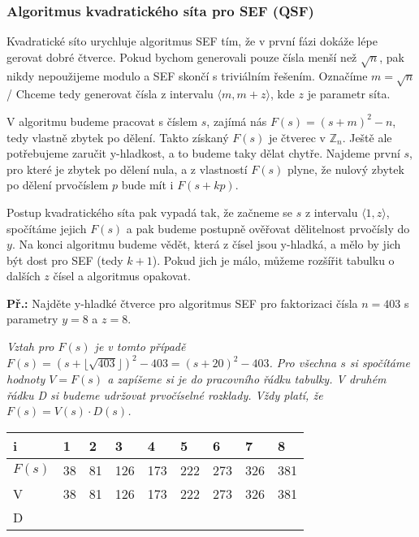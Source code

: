 \documentclass[10pt,a4paper]{article}
\begin{document}
\subsubsection{Algoritmus kvadratického síta pro SEF (QSF)}
Kvadratické síto urychluje algoritmus SEF tím, že v první fázi dokáže lépe gerovat dobré čtverce. Pokud bychom generovali pouze čísla menší než $\sqrt{n}$, pak nikdy nepoužijeme modulo a SEF skončí s triviálním řešením. Označíme $m = \sqrt{n}$/ Chceme tedy generovat čísla z intervalu $\langle m, m + z \rangle$, kde $z$ je parametr síta. 

V algoritmu budeme pracovat s číslem $s$, zajímá nás $F(s) = (s + m)^2 - n$, tedy vlastně zbytek po dělení. Takto získaný $F(s)$ je čtverec v $\mathbb{Z}_n$. Ještě ale potřebujeme zaručit y-hladkost, a to budeme taky dělat chytře. Najdeme první $s$, pro které je zbytek po dělení nula, a z vlastností $F(s)$ plyne, že nulový zbytek po dělení prvočíslem $p$ bude mít i $F(s + kp)$.

Postup kvadratického síta pak vypadá tak, že začneme se $s$ z intervalu $\langle 1, z\rangle$, spočítáme jejich $F(s)$ a pak budeme postupně ověřovat dělitelnost prvočísly do $y$. Na konci algoritmu budeme vědět, která z čísel jsou y-hladká, a mělo by jich být dost pro SEF (tedy $k+1$). Pokud jich je málo, můžeme rozšířit tabulku o dalších $z$ čísel a algoritmus opakovat.

\textbf{Př.:} Najděte y-hladké čtverce pro algoritmus SEF pro faktorizaci čísla $n=403$ s parametry $y = 8$ a $z=8$.

\textit{Vztah pro $F(s)$ je v tomto případě $F(s) = (s +\lfloor \sqrt{403} \rfloor)^2 - 403= (s + 20)^2 - 403$. Pro všechna $s$ si spočítáme hodnoty $V = F(s)$ a zapíšeme si je do pracovního řádku tabulky. V druhém řádku D si budeme udržovat prvočíselné rozklady. Vždy platí, že $F(s) = V(s) \cdot D(s)$.}

\begin{table}[h!]
\centering
\begin{tabular}{|p{1cm}|p{1cm}|p{1cm}|p{1cm}|p{1cm}|p{1cm}|p{1cm}|p{1cm}|p{1cm}|}
\hline
i & 1 & 2 &3 & 4 & 5 & 6 & 7 & 8\\
\hline
\hline
$F(s)$ & 38 & 81 & 126 & 173 & 222 & 273 & 326 & 381\\
\hline
V & 38 & 81 & 126 & 173 & 222 & 273 & 326 & 381\\
\hline
D &  &   &  &   &   &  &   &  \\
\hline
\end{tabular}
\end{table}
\end{document}
